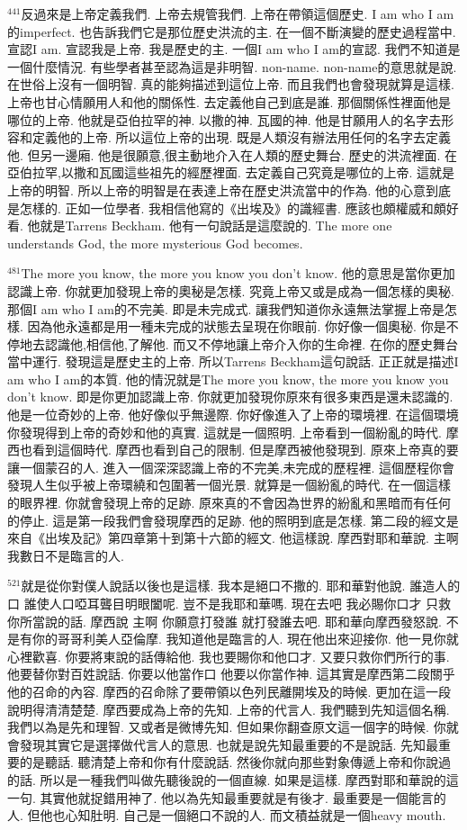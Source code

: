 \documentclass{book}
\begin{document}
$^{441}$反過來是上帝定義我們.
上帝去規管我們.
上帝在帶領這個歷史.
I am who I am的imperfect.
也告訴我們它是那位歷史洪流的主.
在一個不斷演變的歷史過程當中.
宣認I am.
宣認我是上帝.
我是歷史的主.
一個I am who I am的宣認.
我們不知道是一個什麼情況.
有些學者甚至認為這是非明智.
non-name.
non-name的意思就是說.
在世俗上沒有一個明智.
真的能夠描述到這位上帝.
而且我們也會發現就算是這樣.
上帝也甘心情願用人和他的關係性.
去定義他自己到底是誰.
那個關係性裡面他是哪位的上帝.
他就是亞伯拉罕的神.
以撒的神.
瓦國的神.
他是甘願用人的名字去形容和定義他的上帝.
所以這位上帝的出現.
既是人類沒有辦法用任何的名字去定義他.
但另一邊廂.
他是很願意,很主動地介入在人類的歷史舞台.
歷史的洪流裡面.
在亞伯拉罕,以撒和瓦國這些祖先的經歷裡面.
去定義自己究竟是哪位的上帝.
這就是上帝的明智.
所以上帝的明智是在表達上帝在歷史洪流當中的作為.
他的心意到底是怎樣的.
正如一位學者.
我相信他寫的《出埃及》的識經書.
應該也頗權威和頗好看.
他就是Tarrens Beckham.
他有一句說話是這麼說的.
The more one understands God, the more mysterious God becomes.

$^{481}$The more you know, the more you know you don't know.
他的意思是當你更加認識上帝.
你就更加發現上帝的奧秘是怎樣.
究竟上帝又或是成為一個怎樣的奧秘.
那個I am who I am的不完美.
即是未完成式.
讓我們知道你永遠無法掌握上帝是怎樣.
因為他永遠都是用一種未完成的狀態去呈現在你眼前.
你好像一個奧秘.
你是不停地去認識他,相信他,了解他.
而又不停地讓上帝介入你的生命裡.
在你的歷史舞台當中運行.
發現這是歷史主的上帝.
所以Tarrens Beckham這句說話.
正正就是描述I am who I am的本質.
他的情況就是The more you know, the more you know you don't know.
即是你更加認識上帝.
你就更加發現你原來有很多東西是還未認識的.
他是一位奇妙的上帝.
他好像似乎無邊際.
你好像進入了上帝的環境裡.
在這個環境你發現得到上帝的奇妙和他的真實.
這就是一個照明.
上帝看到一個紛亂的時代.
摩西也看到這個時代.
摩西也看到自己的限制.
但是摩西被他發現到.
原來上帝真的要讓一個蒙召的人.
進入一個深深認識上帝的不完美,未完成的歷程裡.
這個歷程你會發現人生似乎被上帝環繞和包圍著一個光景.
就算是一個紛亂的時代.
在一個這樣的眼界裡.
你就會發現上帝的足跡.
原來真的不會因為世界的紛亂和黑暗而有任何的停止.
這是第一段我們會發現摩西的足跡.
他的照明到底是怎樣.
第二段的經文是來自《出埃及記》第四章第十到第十六節的經文.
他這樣說.
摩西對耶和華說.
主啊 我數日不是臨言的人.

$^{521}$就是從你對僕人說話以後也是這樣.
我本是絕口不撒的.
耶和華對他說.
誰造人的口 誰使人口啞耳聾目明眼闔呢.
豈不是我耶和華嗎.
現在去吧 我必賜你口才 只救你所當說的話.
摩西說 主啊 你願意打發誰 就打發誰去吧.
耶和華向摩西發怒說.
不是有你的哥哥利美人亞倫摩.
我知道他是臨言的人.
現在他出來迎接你.
他一見你就心裡歡喜.
你要將東說的話傳給他.
我也要賜你和他口才.
又要只救你們所行的事.
他要替你對百姓說話.
你要以他當作口 他要以你當作神.
這其實是摩西第二段關乎他的召命的內容.
摩西的召命除了要帶領以色列民離開埃及的時候.
更加在這一段說明得清清楚楚.
摩西要成為上帝的先知.
上帝的代言人.
我們聽到先知這個名稱.
我們以為是先和理智.
又或者是微博先知.
但如果你翻查原文這一個字的時候.
你就會發現其實它是選擇做代言人的意思.
也就是說先知最重要的不是說話.
先知最重要的是聽話.
聽清楚上帝和你有什麼說話.
然後你就向那些對象傳遞上帝和你說過的話.
所以是一種我們叫做先聽後說的一個直線.
如果是這樣.
摩西對耶和華說的這一句.
其實他就捉錯用神了.
他以為先知最重要就是有後才.
最重要是一個能言的人.
但他也心知肚明.
自己是一個絕口不說的人.
而文積益就是一個heavy mouth.
\end{document}
